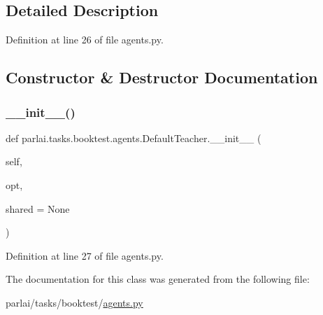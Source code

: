 \subsection{Detailed Description}


Definition at line 26 of file agents.\+py.



\subsection{Constructor \& Destructor Documentation}
\mbox{\label{classparlai_1_1tasks_1_1booktest_1_1agents_1_1DefaultTeacher_a22c8ec41b8b29da86546fe666a3016b0}} 
\subsubsection{\texorpdfstring{\+\_\+\+\_\+init\+\_\+\+\_\+()}{\_\_init\_\_()}}
{\footnotesize\ttfamily def parlai.\+tasks.\+booktest.\+agents.\+Default\+Teacher.\+\_\+\+\_\+init\+\_\+\+\_\+ (\begin{DoxyParamCaption}\item[{}]{self,  }\item[{}]{opt,  }\item[{}]{shared = {\ttfamily None} }\end{DoxyParamCaption})}



Definition at line 27 of file agents.\+py.



The documentation for this class was generated from the following file\+:\begin{DoxyCompactItemize}
\item 
parlai/tasks/booktest/\hyperlink{parlai_2tasks_2booktest_2agents_8py}{agents.\+py}\end{DoxyCompactItemize}
